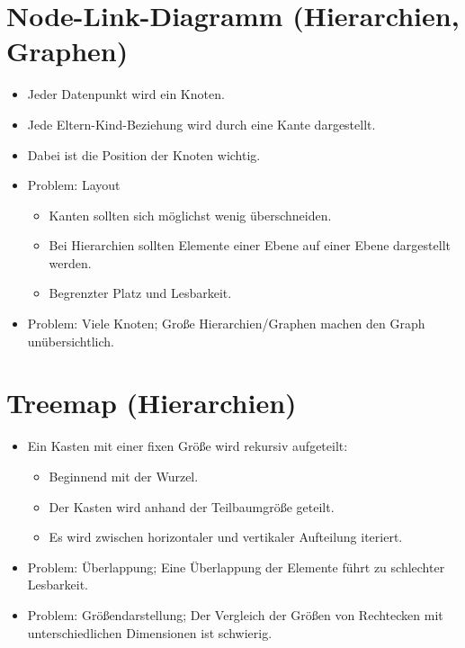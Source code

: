 		\section{Node-Link-Diagramm (Hierarchien, Graphen)}
			\begin{itemize}
				\item Jeder Datenpunkt wird ein Knoten.
				\item Jede Eltern-Kind-Beziehung wird durch eine Kante dargestellt.
				\item Dabei ist die Position der Knoten wichtig.
				\item Problem: Layout
					\begin{itemize}
						\item Kanten sollten sich möglichst wenig überschneiden.
						\item Bei Hierarchien sollten Elemente einer Ebene auf einer Ebene dargestellt werden.
						\item Begrenzter Platz und Lesbarkeit.
					\end{itemize}
				\item Problem: Viele Knoten; Große Hierarchien/Graphen machen den Graph unübersichtlich.
			\end{itemize}

		\section{Treemap (Hierarchien)}
			\begin{itemize}
				\item Ein Kasten mit einer fixen Größe wird rekursiv aufgeteilt:
					\begin{itemize}
						\item Beginnend mit der Wurzel.
						\item Der Kasten wird anhand der Teilbaumgröße geteilt.
						\item Es wird zwischen horizontaler und vertikaler Aufteilung iteriert.
					\end{itemize}
				\item Problem: Überlappung; Eine Überlappung der Elemente führt zu schlechter Lesbarkeit.
				\item Problem: Größendarstellung; Der Vergleich der Größen von Rechtecken mit unterschiedlichen Dimensionen ist schwierig.
			\end{itemize}

